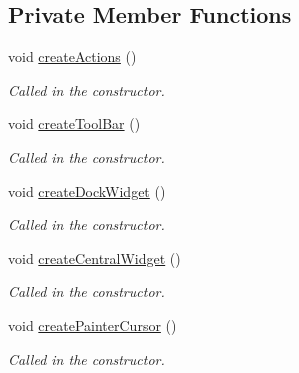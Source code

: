 \subsection*{Private Member Functions}
\begin{DoxyCompactItemize}
\item 
\hypertarget{class_main_window_a62cd8712fb41a754298f6f60eead2cb0}{}void \hyperlink{class_main_window_a62cd8712fb41a754298f6f60eead2cb0}{create\+Actions} ()\label{class_main_window_a62cd8712fb41a754298f6f60eead2cb0}

\begin{DoxyCompactList}\small\item\em Called in the constructor. \end{DoxyCompactList}\item 
\hypertarget{class_main_window_aeb57235ebc08860e680132db167c09b4}{}void \hyperlink{class_main_window_aeb57235ebc08860e680132db167c09b4}{create\+Tool\+Bar} ()\label{class_main_window_aeb57235ebc08860e680132db167c09b4}

\begin{DoxyCompactList}\small\item\em Called in the constructor. \end{DoxyCompactList}\item 
\hypertarget{class_main_window_a0ea51988f2a600d2268c5837e9524d5f}{}void \hyperlink{class_main_window_a0ea51988f2a600d2268c5837e9524d5f}{create\+Dock\+Widget} ()\label{class_main_window_a0ea51988f2a600d2268c5837e9524d5f}

\begin{DoxyCompactList}\small\item\em Called in the constructor. \end{DoxyCompactList}\item 
\hypertarget{class_main_window_a87f94def1c8d92ef141ffb6a20cf3900}{}void \hyperlink{class_main_window_a87f94def1c8d92ef141ffb6a20cf3900}{create\+Central\+Widget} ()\label{class_main_window_a87f94def1c8d92ef141ffb6a20cf3900}

\begin{DoxyCompactList}\small\item\em Called in the constructor. \end{DoxyCompactList}\item 
\hypertarget{class_main_window_a63c084d7cf85814fc8d880cd612015cb}{}void \hyperlink{class_main_window_a63c084d7cf85814fc8d880cd612015cb}{create\+Painter\+Cursor} ()\label{class_main_window_a63c084d7cf85814fc8d880cd612015cb}

\begin{DoxyCompactList}\small\item\em Called in the constructor. \end{DoxyCompactList}\end{DoxyCompactItemize}
